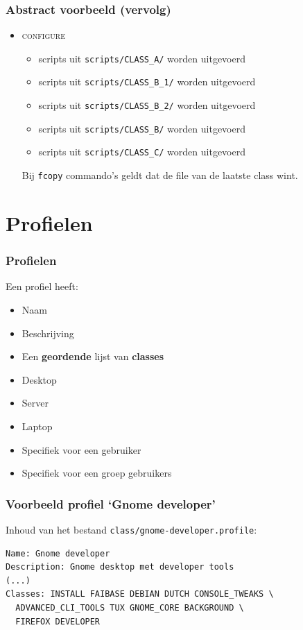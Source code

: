 \documentclass{beamer}
\begin{document}
\begin{frame}
\frametitle{Abstract voorbeeld (vervolg)}
\begin{itemize}
  \item \textsc{configure}
  \begin{itemize}
    \item scripts uit \texttt{scripts/CLASS\_A/} worden uitgevoerd
    \item scripts uit \texttt{scripts/CLASS\_B\_1/} worden uitgevoerd
    \item scripts uit \texttt{scripts/CLASS\_B\_2/} worden uitgevoerd
    \item scripts uit \texttt{scripts/CLASS\_B/} worden uitgevoerd
    \item scripts uit \texttt{scripts/CLASS\_C/} worden uitgevoerd
  \end{itemize}
  Bij \texttt{fcopy} commando's geldt dat de file van de laatste class wint.
\end{itemize}
\end{frame}


\section{Profielen}


\begin{frame}
\frametitle{Profielen}
Een profiel heeft:
\begin{itemize}
  \item<2-> Naam
  \item<3-> Beschrijving
  \item<4-> Een \textbf{geordende} lijst van \textbf{classes}
\end{itemize}

  \begin{itemize}
    \item<5-> Desktop
    \item<5-> Server
    \item<5-> Laptop
    \item<5-> Specifiek voor een gebruiker
    \item<5-> Specifiek voor een groep gebruikers
  \end{itemize}
\end{frame}

\begin{frame}[fragile]
\frametitle{Voorbeeld profiel `Gnome developer'}
Inhoud van het bestand \texttt{class/gnome-developer.profile}:
\begin{verbatim}
Name: Gnome developer
Description: Gnome desktop met developer tools
(...)
Classes: INSTALL FAIBASE DEBIAN DUTCH CONSOLE_TWEAKS \
  ADVANCED_CLI_TOOLS TUX GNOME_CORE BACKGROUND \
  FIREFOX DEVELOPER 
\end{verbatim}
\end{frame}
\end{document}
